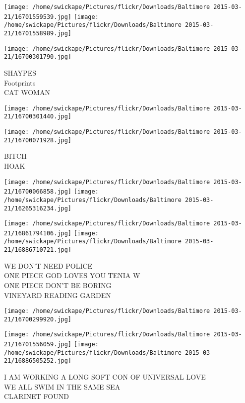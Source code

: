\documentclass[10pt,letterpaper]{article}
\begin{document}
\texttt{[image: /home/swickape/Pictures/flickr/Downloads/Baltimore 2015-03-21/16701559539.jpg]}
\texttt{[image: /home/swickape/Pictures/flickr/Downloads/Baltimore 2015-03-21/16701558989.jpg]}

\vspace{0.25in}
\texttt{[image: /home/swickape/Pictures/flickr/Downloads/Baltimore 2015-03-21/16700301790.jpg]}

SHAYPES\\
Footprints\\
CAT WOMAN\\
\pagebreak

\texttt{[image: /home/swickape/Pictures/flickr/Downloads/Baltimore 2015-03-21/16700301440.jpg]}

\vspace{0.25in}
\texttt{[image: /home/swickape/Pictures/flickr/Downloads/Baltimore 2015-03-21/16700071928.jpg]}

BITCH\\
HOAK\\
\pagebreak

\texttt{[image: /home/swickape/Pictures/flickr/Downloads/Baltimore 2015-03-21/16700066858.jpg]}
\texttt{[image: /home/swickape/Pictures/flickr/Downloads/Baltimore 2015-03-21/16265316234.jpg]}

\texttt{[image: /home/swickape/Pictures/flickr/Downloads/Baltimore 2015-03-21/16861794106.jpg]}
\texttt{[image: /home/swickape/Pictures/flickr/Downloads/Baltimore 2015-03-21/16886710721.jpg]}

WE DON'T NEED POLICE\\
ONE PIECE GOD LOVES YOU TENIA W\\
ONE PIECE DON'T BE BORING\\
VINEYARD READING GARDEN\\
\pagebreak

\texttt{[image: /home/swickape/Pictures/flickr/Downloads/Baltimore 2015-03-21/16700299920.jpg]}

\vspace{0.25in}
\texttt{[image: /home/swickape/Pictures/flickr/Downloads/Baltimore 2015-03-21/16701556059.jpg]}
\texttt{[image: /home/swickape/Pictures/flickr/Downloads/Baltimore 2015-03-21/16886505252.jpg]}

I AM WORKING A LONG SOFT CON OF UNIVERSAL LOVE\\
WE ALL SWIM IN THE SAME SEA\\
CLARINET FOUND\\
\pagebreak
\end{document}
